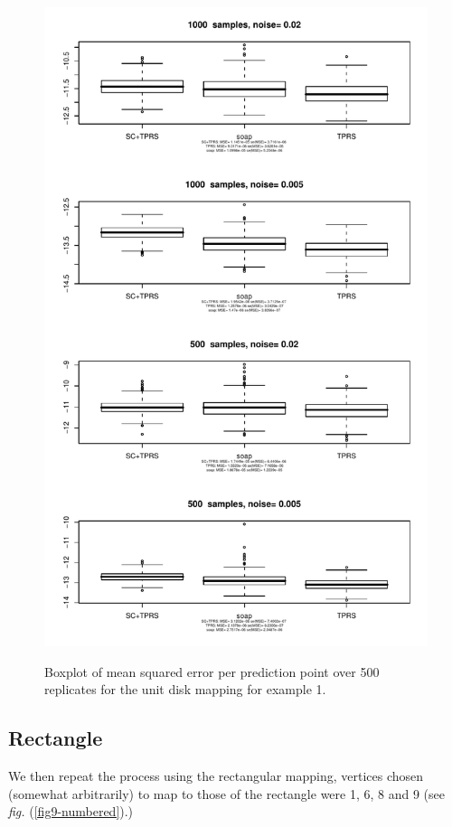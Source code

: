 \documentclass[a4paper,10pt]{amsart}
\newcommand{\fig}[1]{\emph{fig.} (\ref{#1})}
\begin{document}
\begin{figure}[p]
\centering
\includegraphics[width=5in]{figs-otherdomains/fig9-disk-boxplot.pdf} \\
\caption{Boxplot of mean squared error per prediction point over 500 replicates for the unit disk mapping for example 1. }
\label{fig9-disk-boxplots}
\end{figure}


\subsection{Rectangle}

We then repeat the process using the rectangular mapping, vertices chosen (somewhat arbitrarily) to map to those of the rectangle were 1, 6, 8 and 9 (see \fig{fig9-numbered}.)
\end{document}
